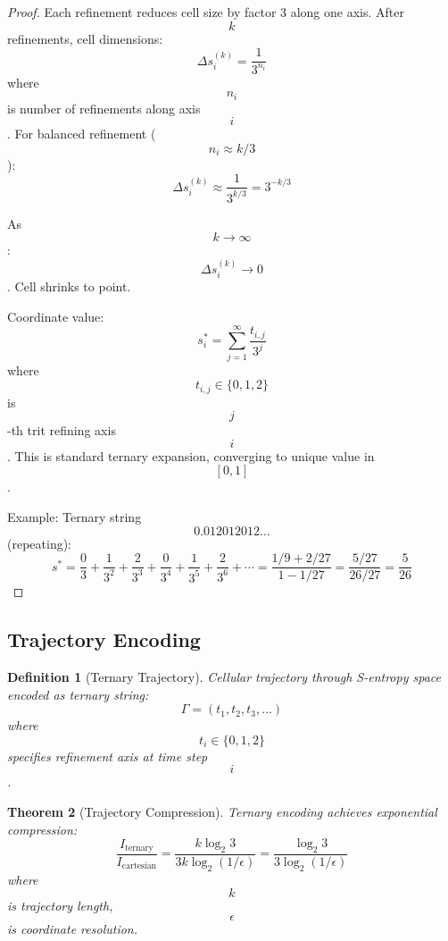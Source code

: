 \documentclass[11pt,twocolumn,a4paper]{article}
\newtheorem{theorem}{Theorem}[section]
\newtheorem{definition}[theorem]{Definition}
\theoremstyle{remark}
\begin{document}
\begin{proof}
Each refinement reduces cell size by factor 3 along one axis. After $$k$$ refinements, cell dimensions:
$$
\Delta s_i^{(k)} = \frac{1}{3^{n_i}}
$$
where $$n_i$$ is number of refinements along axis $$i$$. For balanced refinement ($$n_i \approx k/3$$):
$$
\Delta s_i^{(k)} \approx \frac{1}{3^{k/3}} = 3^{-k/3}
$$

As $$k \to \infty$$: $$\Delta s_i^{(k)} \to 0$$. Cell shrinks to point.

Coordinate value:
$$
s_i^* = \sum_{j=1}^\infty \frac{t_{i,j}}{3^j}
$$
where $$t_{i,j} \in \{0,1,2\}$$ is $$j$$-th trit refining axis $$i$$. This is standard ternary expansion, converging to unique value in $$[0,1]$$.

Example: Ternary string $$0.012012012\ldots$$ (repeating):
$$
s^* = \frac{0}{3} + \frac{1}{3^2} + \frac{2}{3^3} + \frac{0}{3^4} + \frac{1}{3^5} + \frac{2}{3^6} + \cdots = \frac{1/9 + 2/27}{1 - 1/27} = \frac{5/27}{26/27} = \frac{5}{26}
$$
\end{proof}

\subsection{Trajectory Encoding}

\begin{definition}[Ternary Trajectory]
\label{def:ternary_trajectory}
Cellular trajectory through S-entropy space encoded as ternary string:
$$
\Gamma = (t_1, t_2, t_3, \ldots)
$$
where $$t_i \in \{0,1,2\}$$ specifies refinement axis at time step $$i$$.
\end{definition}

\begin{theorem}[Trajectory Compression]
\label{thm:trajectory_compression}
Ternary encoding achieves exponential compression:
$$
\frac{I_{\mathrm{ternary}}}{I_{\mathrm{cartesian}}} = \frac{k \log_2 3}{3k \log_2(1/\epsilon)} = \frac{\log_2 3}{3 \log_2(1/\epsilon)}
$$
where $$k$$ is trajectory length, $$\epsilon$$ is coordinate resolution.
\end{theorem}
\end{document}
